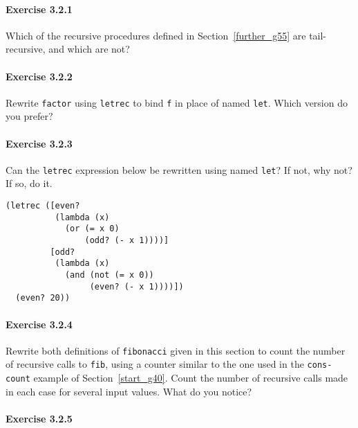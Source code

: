 \paragraph{Exercise \label{further_g56}3.2.1}


\label{further_s52}Which of the recursive procedures defined in Section \ref{further_g55} are
tail-recursive, and which are not?




\paragraph{Exercise \label{further_g57}3.2.2}


\label{further_s53}Rewrite \label{further_s54}\texttt{factor} using \texttt{letrec} to bind \texttt{f} in place of named \texttt{let}.
Which version do you prefer?




\paragraph{Exercise \label{further_g58}3.2.3}


\label{further_s55}Can the \texttt{letrec} expression below
be rewritten using named \texttt{let}?
If not, why not?
If so, do it.


\begin{alltt}
(letrec ([even?
          (lambda (x)
            (or (= x 0)
                (odd? (- x 1))))]
         [odd?
          (lambda (x)
            (and (not (= x 0))
                 (even? (- x 1))))])
  (even? 20))
\end{alltt}



\paragraph{Exercise \label{further_g59}3.2.4}


\label{further_s56}Rewrite both definitions of \texttt{fibonacci} given in this section to count
the number of recursive calls to \texttt{fib}, using a counter similar to the
one used in the \texttt{cons-count} example of Section \ref{start_g40}.
Count the number of recursive calls made in each case for several
input values.
What do you notice?




\paragraph{Exercise \label{further_g60}3.2.5}


